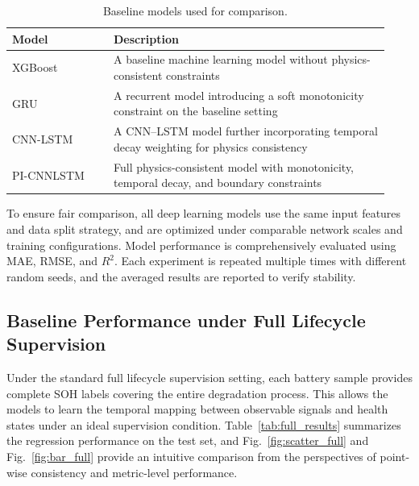 \documentclass[a4paper,fleqn]{cas-dc}
\begin{document}
\begin{table}[pos=htbp]
\centering
\renewcommand{\arraystretch}{1.2}
\caption{Baseline models used for comparison.}
\label{tab:baselines}
\begin{tabular*}{\tblwidth}{@{}p{0.25\linewidth}p{0.68\linewidth}@{}}
\toprule
\textbf{Model} & \textbf{Description} \\
\midrule
XGBoost    & A baseline machine learning model without physics-consistent constraints \\
GRU        & A recurrent model introducing a soft monotonicity constraint on the baseline setting \\
CNN-LSTM   & A CNN--LSTM model further incorporating temporal decay weighting for physics consistency \\
PI-CNNLSTM & Full physics-consistent model with monotonicity, temporal decay, and boundary constraints \\
\bottomrule
\end{tabular*}
\end{table}

To ensure fair comparison, all deep learning models use the same input features and data split strategy, and are optimized under comparable network scales and training configurations. Model performance is comprehensively evaluated using MAE, RMSE, and $R^2$. Each experiment is repeated multiple times with different random seeds, and the averaged results are reported to verify stability.

\subsection{Baseline Performance under Full Lifecycle Supervision}
\label{subsec:full_supervision}

Under the standard full lifecycle supervision setting, each battery sample provides complete SOH labels covering the entire degradation process. This allows the models to learn the temporal mapping between observable signals and health states under an ideal supervision condition. Table~\ref{tab:full_results} summarizes the regression performance on the test set, and Fig.~\ref{fig:scatter_full} and Fig.~\ref{fig:bar_full} provide an intuitive comparison from the perspectives of point-wise consistency and metric-level performance.
\end{document}
